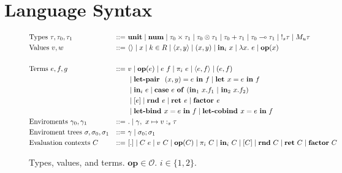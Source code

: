 \section{Language Syntax}

\begin{figure}[tbp]
  \begin{alignat*}{3}
         &\text{Types } \tau, \tau_0, \tau_1 &::=~ &\mathbf{unit}
         \mid \textbf{num}
         \mid \tau_0 \times \tau_1
         \mid \tau_0 \otimes \tau_1
         \mid \tau_0 + \tau_1
         \mid \tau_0 \multimap \tau_1
         \mid {{!_{s}} \tau}
         \mid {M_u \tau}
         \\
         &\text{Values } v, w \ &::=~ &\langle \rangle
         \mid x
         \mid k \in R
         \mid \langle x,y \rangle 
         \mid (x, y)
         \mid \textbf{in}_i \ x
         \mid \lambda x.~e
         \mid \mathbf{op}(x) \\
         \\
         &\text{Terms } e, f, g &::=~ &v
         \mid \mathbf{op}(e)
         \mid e~f
         \mid {\pi}_i\ e
         \mid \langle e,f \rangle 
         \mid (e, f) \\
         & & & \mid \textbf{let-pair } \ (x,y) = e \ \textbf{in} \ f
         \mid \textbf{let } x  = e \ \textbf{in} \ f \\
         & & & \mid \textbf{in}_i \ e
         \mid 
          \mathbf{case} \ e \ \mathbf{of} \ (\textbf{in}_1 \ x.f_1 \ | \ \textbf{in}_2 \ x.f_2) \\
         & & &
         \mid [e]
         \mid \textbf{rnd } e
         \mid {\textbf{ret }e} 
         \mid \textbf{factor } e \\
         & & & 
         \mid {\textbf{let-bind }x = e \ \textbf{in}\ f}
         \mid \textbf{let-cobind } x = e \ \textbf{in} \ f
         \\
         &\text{Enviroments } \gamma_0, \gamma_1 &::=~ &.
         \mid \gamma, \ x \mapsto v :_s \tau \\
         &\text{Enviroment trees } \sigma, \sigma_0, \sigma_1 &::=~ & \gamma
         \mid \sigma_0; \sigma_1 \\
         &\text{Evaluation contexts } C &::=~ &[.] \mid C~e \mid v~C \mid
         \mathbf{op}(C) \mid \pi_i~C \mid \mathbf{in}_i~C \mid [ C ] \mid
         \mathbf{rnd}~C \mid \mathbf{ret}~C \mid \mathbf{factor}~C \\ 
  \end{alignat*}
  \caption{
    Types, values, and terms. 
    $\mathbf{op} \in \mathcal{O}$.
    $i \in \{1, 2\}$. 
  }
  \label{fig:syntax}
\end{figure}
